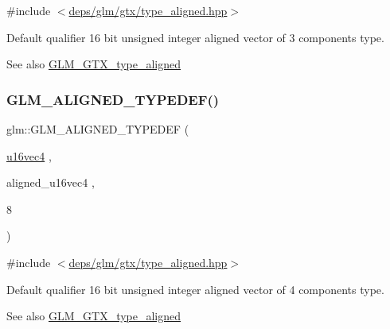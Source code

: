 {\ttfamily \#include $<$\hyperlink{gtx_2type__aligned_8hpp}{deps/glm/gtx/type\+\_\+aligned.\+hpp}$>$}

Default qualifier 16 bit unsigned integer aligned vector of 3 components type. \begin{DoxySeeAlso}{See also}
\hyperlink{group__gtx__type__aligned}{G\+L\+M\+\_\+\+G\+T\+X\+\_\+type\+\_\+aligned} 
\end{DoxySeeAlso}
\mbox{\label{group__gtx__type__aligned_gaecafb5996f5a44f57e34d29c8670741e}} 
\subsubsection{\texorpdfstring{G\+L\+M\+\_\+\+A\+L\+I\+G\+N\+E\+D\+\_\+\+T\+Y\+P\+E\+D\+E\+F()}{GLM\_ALIGNED\_TYPEDEF()}\hspace{0.1cm}{\footnotesize\ttfamily [128/209]}}
{\footnotesize\ttfamily glm\+::\+G\+L\+M\+\_\+\+A\+L\+I\+G\+N\+E\+D\+\_\+\+T\+Y\+P\+E\+D\+EF (\begin{DoxyParamCaption}\item[{\hyperlink{group__gtc__type__precision_ga049d45ad8d0f78578d7ceb86a7fdaae4}{u16vec4}}]{,  }\item[{aligned\+\_\+u16vec4}]{,  }\item[{8}]{ }\end{DoxyParamCaption})}



{\ttfamily \#include $<$\hyperlink{gtx_2type__aligned_8hpp}{deps/glm/gtx/type\+\_\+aligned.\+hpp}$>$}

Default qualifier 16 bit unsigned integer aligned vector of 4 components type. \begin{DoxySeeAlso}{See also}
\hyperlink{group__gtx__type__aligned}{G\+L\+M\+\_\+\+G\+T\+X\+\_\+type\+\_\+aligned} 
\end{DoxySeeAlso}
\mbox{\label{group__gtx__type__aligned_gac6b161a04d2f8408fe1c9d857e8daac0}} 
